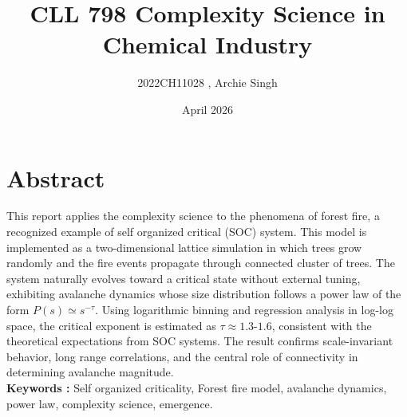 \documentclass{article}
\begin{document}
\title{\textbf{CLL 798 Complexity Science in Chemical Industry}}
\author{2022CH11028 , Archie Singh}
\date{April 2026}
\maketitle

\maketitle
\newpage
\section{Abstract}
This report applies the complexity science to the phenomena of forest fire, a recognized example of self organized critical (SOC) system. This model is implemented as a two-dimensional  lattice simulation in which trees grow randomly and the fire events propagate through connected cluster of trees. The system
naturally evolves toward a critical state without external tuning, exhibiting avalanche dynamics whose size distribution follows a power law of the form $ P(s) \simeq s^{-\tau} $. Using logarithmic binning and regression analysis in log-log space, the critical exponent is estimated as $ \tau \approx 1.3\text{-}1.6 $, consistent with the theoretical expectations from SOC systems. The result confirms scale-invariant behavior, long range correlations, and the central role of connectivity in determining avalanche magnitude.\\
\textbf{Keywords :} Self organized criticality, Forest fire model, avalanche dynamics, power law, complexity science, emergence.\\
\\
\end{document}
